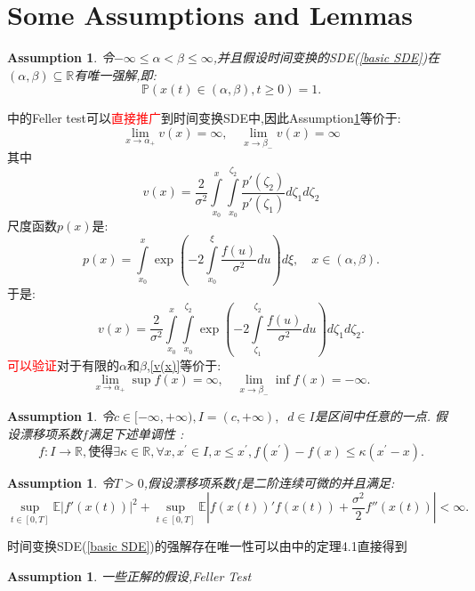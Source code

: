 \documentclass[12pt,final]{article}
\numberwithin{equation}{section}
\numberwithin{figure}{section}
\numberwithin{table}{section}
\theoremstyle{plain}
\newtheorem{assumption}[theorem]{Assumption} %
\theoremstyle{definition}
\theoremstyle{remark}
\begin{document}
	\section{Some Assumptions and Lemmas}
	\begin{assumption}\label{assum1}
		令$-\infty\leq\alpha<\beta\leq\infty$,并且假设时间变换的SDE(\ref{basic SDE})在$(\alpha,\beta)\subseteq\mathbb{R}$有唯一强解,即:$$\mathbb{P}(x(t)\in(\alpha,\beta), t\geq0)=1.$$
	\end{assumption}
	\cite{KaratzasShreveBM}中的Feller test可以\textcolor{red}{直接推广}到时间变换SDE中,因此Assumption\ref{assum1}等价于:
	\begin{equation}\label{v(x)}
		\lim\limits_{x\to\alpha_+}v(x)=\infty,\quad\lim\limits_{x\to\beta_-}v(x)=\infty
	\end{equation}
	其中
	$$v(x)=\frac{2}{\sigma^2}\int\limits_{x_0}^x\int\limits_{x_0}^{\zeta_2}\frac{p'(\zeta_2)}{p'(\zeta_1)}d\zeta_1d\zeta_2$$
	尺度函数$p(x)$是:
	$$p(x)=\int\limits_{x_0}^x\exp\left(-2\int\limits_{x_0}^\xi\frac{f(u)}{\sigma^2}du\right)d\xi,\quad x\in(\alpha,\beta).$$
	于是:$$v(x)=\frac{2}{\sigma^2}\int\limits_{x_0}^x\int\limits_{x_0}^{\zeta_2}\exp\left(-2\int\limits_{\zeta_1}^{\zeta_2}\frac{f(u)}{\sigma^2} du\right)d\zeta_1d\zeta_2.$$
	\textcolor{red}{可以验证}对于有限的$\alpha$和$\beta$,\eqref{v(x)}等价于:$$\lim\limits_{x\to\alpha_+}\sup f(x)=\infty,\quad\lim\limits_{x\to\beta_-}\inf f(x)=-\infty.$$
	\begin{assumption}\label{assum2}
		令$c\in[-\infty,+\infty),I=(c,+\infty),\operatorname{}d\in I$是区间中任意的一点. 假设漂移项系数$f$满足下述单调性 :
		\begin{equation}
			f:I\to\mathbb{R}  , 使得 \exists\kappa\in\mathbb{R},\forall x,x^\prime\in I,x\leq x^\prime,f(x^\prime)-f(x)\leq\kappa(x^\prime-x).
		\end{equation}
	\end{assumption}
	\begin{assumption}\label{assum3}
		令$T>0$,假设漂移项系数$f$是二阶连续可微的并且满足:
		\begin{equation}
			\sup\limits_{t\in[0,T]}\mathbb{E}\left|f'(x(t))\right|^2+
			\sup\limits_{t\in[0,T]}\mathbb{E}\left|f(x(t))'f(x(t))+
			\frac{\sigma^2}2f''(x(t))\right|<\infty.
		\end{equation}
	\end{assumption}
	时间变换SDE(\ref{basic SDE})的强解存在唯一性可以由\cite{kobayashi2011stochastic}中的定理4.1直接得到
	\begin{assumption}
		一些正解的假设,Feller Test
	\end{assumption}
\end{document}
